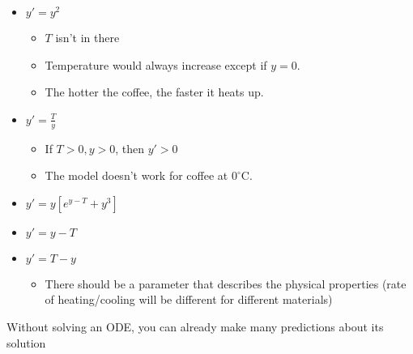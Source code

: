 \begin{itemize}
\begin{example}
              \begin{itemize}
                  \item $y'=y^2$
                        \begin{itemize}
                            \item $T$ isn't in there
                            \item Temperature would always increase except if $y=0$.
                            \item The hotter the coffee, the faster it heats up.
                        \end{itemize}
                  \item $y'=\frac{T}{y}$
                        \begin{itemize}
                            \item If $T>0, y>0$, then $y'>0$
                            \item The model doesn't work for coffee at $0^\circ \text{C}$.
                        \end{itemize}
                  \item $y'=y[e^{y-T}+y^3]$
                  \item $y'=y-T$
                  \item $y'=T-y$
                        \begin{itemize}
                            \item There should be a parameter that describes the physical properties (rate of heating/cooling will be different for different materials)
                        \end{itemize}
              \end{itemize}
          \end{example}
          \begin{idea}
            Without solving an ODE, you can already make many predictions about its solution
            \vspace{2mm}


\end{idea}
\end{itemize}
